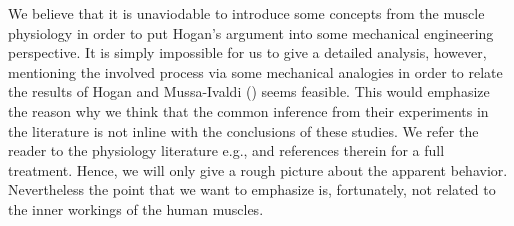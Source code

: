 We believe that it is unaviodable to introduce some concepts from the muscle physiology in order to put Hogan's 
argument into some mechanical engineering perspective. It is simply impossible for us to give a detailed analysis, 
however, mentioning the involved process via some mechanical analogies in order to relate the results of 
Hogan and Mussa-Ivaldi (\cite{mussa85}) seems feasible. This would emphasize the reason why we think that the common inference 
from their experiments in the literature is not inline with the conclusions of these studies. We refer the reader 
to the physiology literature e.g., \cite{spudich,millman,offer,horowits,yildiz,geeves} and references therein for a full 
treatment. Hence, we will only give a rough picture about the apparent behavior. Nevertheless the point that we want 
to emphasize is, fortunately, not related to the inner workings of the human muscles.

%
%

